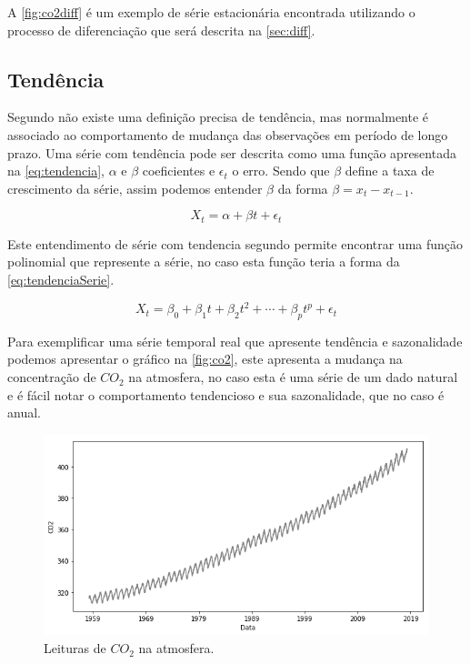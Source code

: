\documentclass[
	12pt,
	oneside,
	a4paper,
	english,
	brazil
]{abntex2}
\begin{document}
A \autoref{fig:co2diff} é um exemplo de série estacionária encontrada utilizando 
o processo de diferenciação que será descrita na \autoref{sec:diff}.

\subsection{Tendência}

Segundo  não existe uma definição precisa de tendência, mas 
normalmente é associado ao comportamento de mudança das observações em período 
de longo prazo. Uma série com tendência pode ser descrita como uma função 
apresentada na \autoref{eq:tendencia}, $\alpha$ e $\beta{}$ coeficientes e 
$\epsilon{}_t$ o erro. Sendo que $\beta{}$ define a taxa de crescimento da 
série, assim podemos entender $\beta$ da forma $\beta = x_t - x_{t-1}$.

\begin{equation}
	\label{eq:tendencia}
	X_t = \alpha + \beta{}t + \epsilon{}_t
\end{equation}

Este entendimento de série com tendencia segundo  permite 
encontrar uma função polinomial que represente a série, no caso esta função 
teria a forma da \autoref{eq:tendenciaSerie}.

\begin{equation}
    \label{eq:tendenciaSerie}
    X_t = \beta_0 + \beta_1t + \beta_2t^2 + \cdots + \beta_{p}t^p + \epsilon_t
\end{equation}

Para exemplificar uma série temporal real que apresente tendência e sazonalidade 
podemos apresentar o gráfico na \autoref{fig:co2}, este apresenta a mudança na 
concentração de $CO_2$ na atmosfera, no caso esta é uma série de um dado natural 
e é fácil notar o comportamento tendencioso e sua sazonalidade, que no caso é 
anual.

\begin{figure}
    \centering
    \caption{Leituras de $CO_2$ na atmosfera.}\label{fig:co2}
    \includegraphics[width=.6\linewidth]{images/co2.png}
\end{figure}
\end{document}
